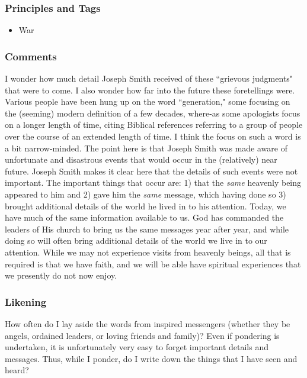 \documentclass[12pt]{report}
\begin{document}
\subsubsection{Principles and Tags\label{js:principles12}}
\begin{itemize}
\item {}War
\end{itemize}

\subsubsection{Comments\label{js:comments12}}
I wonder how much detail Joseph Smith received of these ``grievous judgments" that were to come.  I also wonder how far into the future these foretellings were.  Various people have been hung up on the word ``generation," some focusing on the (seeming) modern definition of a few decades, where-as some apologists focus on a longer length of time, citing Biblical references referring to a group of people over the course of an extended length of time.  I think the focus on such a word is a bit narrow-minded.  The point here is that Joseph Smith was made aware of unfortunate and disastrous events that would occur in the (relatively) near future.  Joseph Smith makes it clear here that the details of such events were not important.  The important things that occur are: 1) that the \emph{same} heavenly being appeared to him and 2) gave him the \emph{same} message, which having done so 3) brought additional details of the world he lived in to his attention.  Today, we have much of the same information available to us.  God has commanded the leaders of His church to bring us the same messages year after year, and while doing so will often bring additional details of the world we live in to our attention.  While we may not experience visits from heavenly beings, all that is required is that we have faith, and we will be able have spiritual experiences that we presently do not now enjoy.

\subsubsection{Likening\label{js:likening12}}
How often do I lay aside the words from inspired messengers (whether they be angels, ordained leaders, or loving friends and family)?  Even if pondering is undertaken, it is unfortunately very easy to forget important details and messages.  Thus, while I ponder, do I write down the things that I have seen and heard?
\end{document}
